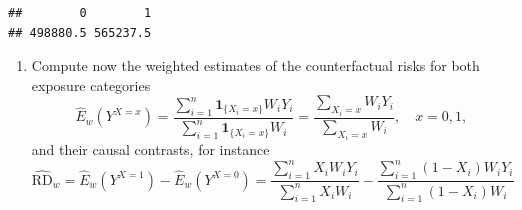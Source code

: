\documentclass[
]{book}
\newenvironment{Shaded}{\begin{snugshade}}{\end{snugshade}}
\newcommand{\DecValTok}[1]{\textcolor[rgb]{0.00,0.00,0.81}{#1}}
\newcommand{\FunctionTok}[1]{\textcolor[rgb]{0.13,0.29,0.53}{\textbf{#1}}}
\newcommand{\NormalTok}[1]{#1}
\newcommand{\OtherTok}[1]{\textcolor[rgb]{0.56,0.35,0.01}{#1}}
\newcommand{\SpecialCharTok}[1]{\textcolor[rgb]{0.81,0.36,0.00}{\textbf{#1}}}
\providecommand{\tightlist}{%
  \setlength{\itemsep}{0pt}\setlength{\parskip}{0pt}}
\begin{document}
\begin{Shaded}
\end{Shaded}

\begin{verbatim}
##        0        1 
## 498880.5 565237.5
\end{verbatim}

\begin{enumerate}
\def\labelenumi{\arabic{enumi}.}
\setcounter{enumi}{3}
\tightlist
\item
  Compute now the weighted estimates of the
  counterfactual risks for both exposure categories
  \[ \widehat{E}_w(Y^{X = x}) =
  \frac{ \sum_{i=1}^n {\mathbf 1}_{ \{X_i=x\} } W_i Y_i }
     {\sum_{i=1}^n {\mathbf 1}_{ \{X_i=x\} }W_i} =
   \frac{ \sum_{X_i = x} W_i Y_i }{\sum_{X_i=x} W_i}, \quad x = 0,1, \]
  and their causal contrasts, for instance
  \[ \widehat{\text{RD}}_{w} = \widehat{E}_w(Y^{X = 1}) -
                \widehat{E}_w(Y^{X = 0})
   =   \frac{ \sum_{i=1}^n X_i W_i Y_i }{\sum_{i=1}^n X_i W_i} -
      \frac{ \sum_{i=1}^n (1-X_i) W_i Y_i }{\sum_{i=1}^n (1-X_i) W_i}
  \]
\end{enumerate}

\begin{Shaded}
\end{Shaded}
\end{document}
